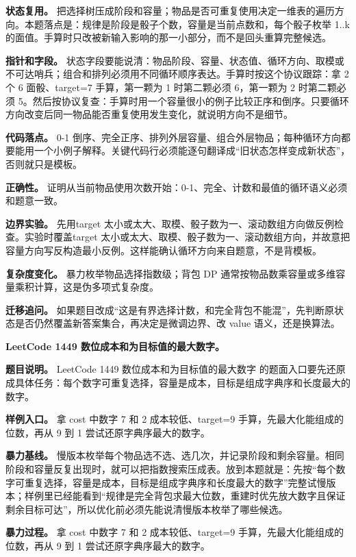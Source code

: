 \textbf{状态复用。} 把选择树压成阶段和容量；物品是否可重复使用决定一维表的遍历方向。本题落点是：规律是阶段是骰子个数，容量是当前点数和，每个骰子枚举 1..k 的面值。手算时只改被新输入影响的那一小部分，而不是回头重算完整候选。

\textbf{指针和字段。} 状态字段要能说清：物品阶段、容量、状态值、循环方向、取模或不可达哨兵；组合和排列必须用不同循环顺序表达。手算时按这个协议跟踪：拿 2 个 6 面骰、target=7 手算，第一颗为 1 时第二颗必须 6，第一颗为 2 时第二颗必须 5。然后按协议复查：手算时用一个容量很小的例子比较正序和倒序。只要循环方向改变后同一物品能否重复使用发生变化，就说明方向不是细节。

\textbf{代码落点。} 0-1 倒序、完全正序、排列外层容量、组合外层物品；每种循环方向都要能用一个小例子解释。关键代码行必须能逐句翻译成“旧状态怎样变成新状态”，否则就只是模板。

\textbf{正确性。} 证明从当前物品使用次数开始：0-1、完全、计数和最值的循环语义必须和题意一致。

\textbf{边界实验。} 先用target 太小或太大、取模、骰子数为一、滚动数组方向做反例检查。实验时覆盖target 太小或太大、取模、骰子数为一、滚动数组方向，并故意把容量方向写反构造最小反例。这样能确认循环方向来自题意，不是背模板。

\textbf{复杂度变化。} 暴力枚举物品选择指数级；背包 DP 通常按物品数乘容量或多维容量乘积计算，这是伪多项式复杂度。

\textbf{迁移追问。} 如果题目改成“这是有界选择计数，和完全背包不能混”，先判断原状态是否仍然覆盖新答案集合，再决定是微调边界、改 value 语义，还是换算法。

\noindent\textbf{LeetCode 1449 数位成本和为目标值的最大数字。}

\textbf{题目说明。} LeetCode 1449 数位成本和为目标值的最大数字 的题面入口要先还原成具体任务：每个数字可重复选择，容量是成本，目标是组成字典序和长度最大的数字。

\textbf{样例入口。} 拿 cost 中数字 7 和 2 成本较低、target=9 手算，先最大化能组成的位数，再从 9 到 1 尝试还原字典序最大的数字。

\textbf{暴力基线。} 慢版本枚举每个物品选不选、选几次，并记录阶段和剩余容量。相同阶段和容量反复出现时，就可以把指数搜索压成表。放到本题就是：先按“每个数字可重复选择，容量是成本，目标是组成字典序和长度最大的数字”完整试慢版本；样例里已经能看到“规律是完全背包求最大位数，重建时优先放大数字且保证剩余目标可达”，所以优化前必须先能说清慢版本枚举了哪些候选。

\textbf{暴力过程。} 拿 cost 中数字 7 和 2 成本较低、target=9 手算，先最大化能组成的位数，再从 9 到 1 尝试还原字典序最大的数字。

